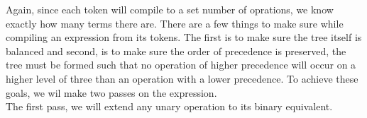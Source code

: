 \documentclass[11pt,a4paper]{article}
\begin{document}
Again, since each token will compile to a set number of oprations, we know exactly how many terms there are. There are a few things to make sure while compiling an expression from its tokens. The first is to make sure the tree itself is balanced and second, is to make sure the order of precedence is preserved, the tree must be formed such that no operation of higher precedence will occur on a higher level of three than an operation with a lower precedence. To achieve these goals, we wil make two passes on the expression.\\

The first pass, we will extend any unary operation to its binary equivalent.
\end{document}
